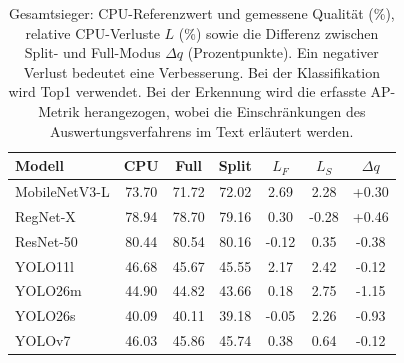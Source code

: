\begin{table}[!htb]
\centering\small\setlength{\tabcolsep}{3pt}
\caption{Gesamtsieger: CPU-Referenzwert und gemessene Qualität (\%), relative CPU-Verluste $L$ (\%) sowie die Differenz zwischen Split- und Full-Modus $\Delta q$ (Prozentpunkte). Ein negativer Verlust bedeutet eine Verbesserung. Bei der Klassifikation wird Top1 verwendet. Bei der Erkennung wird die erfasste AP-Metrik herangezogen, wobei die Einschränkungen des Auswertungsverfahrens im Text erläutert werden.}
\label{tab:review:quality}
\begin{tabular*}{\linewidth}{@{\extracolsep{\fill}}l S[table-format=+2.2] S[table-format=+2.2] S[table-format=+2.2] S[table-format=+2.2] S[table-format=+2.2] S[table-format=+1.2]@{}}
\toprule
Modell & {CPU} & {Full} & {Split} & {$L_F$} & {$L_S$} & {$\Delta q$} \\
\midrule
MobileNetV3-L & 73.70 & 71.72 & 72.02 & 2.69 & 2.28 & +0.30 \\
RegNet-X & 78.94 & 78.70 & 79.16 & 0.30 & -0.28 & +0.46 \\
ResNet-50 & 80.44 & 80.54 & 80.16 & -0.12 & 0.35 & -0.38 \\
YOLO11l & 46.68 & 45.67 & 45.55 & 2.17 & 2.42 & -0.12 \\
YOLO26m & 44.90 & 44.82 & 43.66 & 0.18 & 2.75 & -1.15 \\
YOLO26s & 40.09 & 40.11 & 39.18 & -0.05 & 2.26 & -0.93 \\
YOLOv7 & 46.03 & 45.86 & 45.74 & 0.38 & 0.64 & -0.12 \\
\bottomrule\end{tabular*}\end{table}
